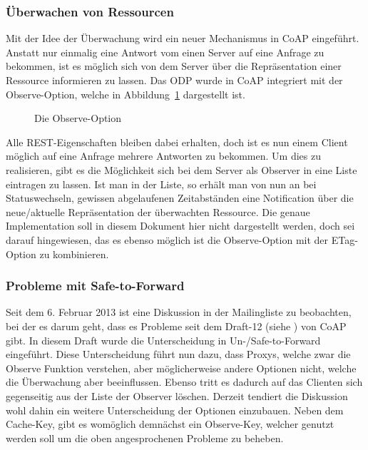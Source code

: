 \subsubsection{Überwachen von Ressourcen}
Mit der Idee der Überwachung wird ein neuer Mechanismus in \ac{CoAP} eingeführt.
Anstatt nur einmalig eine Antwort vom einen Server auf eine Anfrage zu bekommen, ist es möglich sich
von dem Server über die Repräsentation einer Ressource informieren zu lassen.
Das \ac{ODP}\cite{GAMMAETAL} wurde in \ac{CoAP} integriert mit der Observe-Option, welche in
Abbildung~\ref{table:observeoption} dargestellt ist.
 \begin{figure}[htbp]
    \centering
    \begin{minipage}{.94\textwidth}
    
    \caption{Die Observe-Option}
    \end{minipage}
    \label{table:observeoption}
\end{figure}
Alle \ac{REST}-Eigenschaften bleiben dabei erhalten, doch ist es nun einem Client möglich auf eine
Anfrage mehrere Antworten zu bekommen.
Um dies zu realisieren, gibt es die Möglichkeit sich bei dem Server als Observer in eine Liste
eintragen zu lassen.
Ist man in der Liste, so erhält man von nun an bei Statuswechseln, gewissen abgelaufenen
Zeitabständen eine Notification über die neue/aktuelle Repräsentation der überwachten Ressource.
Die genaue Implementation soll in diesem Dokument hier nicht dargestellt werden, doch sei darauf
hingewiesen, das es ebenso möglich ist die Observe-Option mit der ETag-Option zu kombinieren.
\subsubsection{Probleme mit Safe-to-Forward}
Seit dem 6. Februar 2013 ist eine Diskussion in der Mailingliste zu beobachten, bei der es darum
geht, dass es Probleme seit dem Draft-12 (siehe \cite{draft-ietf-core-coap-12}) von \ac{CoAP} gibt.
In diesem Draft wurde die Unterscheidung in Un-/Safe-to-Forward eingeführt.
Diese Unterscheidung führt nun dazu, dass Proxys, welche zwar die Observe Funktion verstehen, aber
möglicherweise andere Optionen nicht, welche die Überwachung aber beeinflussen.
Ebenso tritt es dadurch auf das Clienten sich gegenseitig aus der Liste der Observer löschen.
Derzeit tendiert die Diskussion wohl dahin ein weitere Unterscheidung der Optionen einzubauen.
Neben dem Cache-Key, gibt es womöglich demnächst ein Observe-Key, welcher genutzt werden soll um
die oben angesprochenen Probleme zu beheben.
